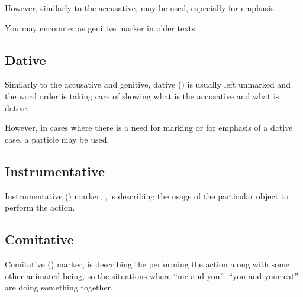 However, similarly to the accusative,  may be used, especially for
emphasis.


You may encounter  as genitive marker in older texts.

\subsection{Dative}

Similarly to the accusative and genitive, dative (\Dat{}) is usually left
unmarked and the word order is taking care of showing what is the accusative and
what is dative.


However, in cases where there is a need for marking or for emphasis of a dative
case, a  particle may be used.



\subsection{Instrumentative}

Instrumentative (\Ins{}) marker, , is describing the usage of the
particular object to perform the action.


\subsection{Comitative}

Comitative (\Com{}) marker,  is describing the performing the action
along with some other animated being, so the situations where ``me and you'',
``you and your cat'' are doing something together.



